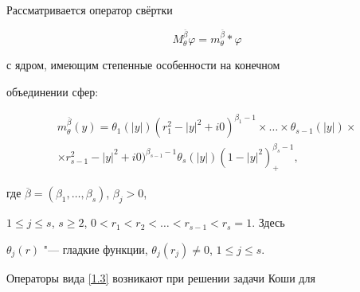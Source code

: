 


\date{03/VIII/2011} %









\maketitle





 Рассматривается оператор свёртки

\begin{equation}

\label{1.3}

M_{\theta}^{\overline{\beta}}{\varphi}=m_{\theta}^{\overline{\beta}}*\varphi

\end{equation}

с ядром, имеющим степенные особенности на конечном

объединении сфер:

\begin{multline}

\label{1.4}

m_{\theta}^{\overline{\beta}}(y)=\theta_1(|y|)(r_1^2-|y|^2+i0)^{\beta_1-1}\times\ldots\times\theta_{s-1}(|y|)

\times\\

\times

r_{s-1}^2-|y|^2+i0)^{\beta_{s-1}-1}\theta_{s}(|y|)(1-|y|^2)^{\beta_{s}-1}_+,

\end{multline}

где ${\overline{\beta}}=(\beta_1,\ldots,\beta_s)$, $\beta_j>0$,

$1\leq j\leq s$, $s\geq2$, $0<r_1< r_2<\ldots< r_{s-1}<r_s=1$. Здесь

$\theta_j(r)$ "--- гладкие функции, $\theta_j(r_j)\neq0$, $1\leq

j\leq s$.



Операторы вида \eqref{1.3} возникают при решении задачи Коши для

